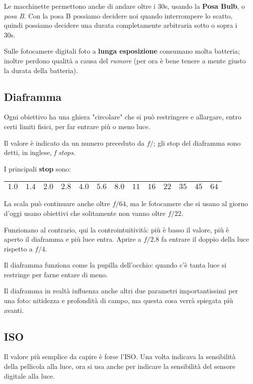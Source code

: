 Le macchinette permettono anche di andare oltre i 30s, usando la \textbf{Posa Bulb}, o \textit{posa B}.
Con la posa B possiamo decidere noi quando interrompere lo scatto, quindi possiamo decidere una durata completamente arbitraria sotto o sopra i 30s.

\nb Sulle fotocamere digitali foto a \textbf{lunga esposizione} consumano molta batteria; inoltre perdono qualità a causa del \textit{rumore} (per ora è bene tenere a mente giusto la durata della batteria).


\subsection{Diaframma} \label{subsec:diaframma}
Ogni obiettivo ha una ghiera "circolare" che si può restringere e allargare, entro certi
limiti fisici, per far entrare più o meno luce.

Il valore è indicato da un numero preceduto da $f/$; gli stop del diaframma sono detti, in inglese, \textit{f stops}.

I principali \textbf{stop} sono:
\begin{table}[h]
    \centering
    \begin{tabular}{|l|l|l|l|l|l|l|l|l|l|l|l|l|}
        \hline
        $1.0$ & $1.4$ & $2.0$ & $2.8$ & $4.0$ & $5.6$ & $8.0$ & $11$ & $16$ & $22$ & $35$ & $45$ & $64$\\
        \hline
    \end{tabular}
\end{table}

\nb La scala può continuare anche oltre $f/64$, ma le fotocamere che si usano al giorno d'oggi usano obiettivi che solitamente non vanno oltre $f/22$.

Funzionano al contrario, qui la controintuitività: più è basso il valore, più è aperto il
diaframma e più luce entra.\newline
Aprire a $f/2.8$ fa entrare il doppio della luce rispetto a $f/4$.

Il diaframma funziona come la pupilla dell'occhio: quando c'è tanta luce si restringe per farne entare di meno.

Il diaframma in realtà influenza anche altri due parametri importantissimi per una foto:
nitidezza e profondità di campo, ma questa cosa verrà spiegata più avanti.


\subsection{ISO}  \label{subsec:ISO}
Il valore più semplice da capire è forse l'ISO.
Una volta indicava la sensibilità della pellicola alla luce, ora si usa anche per indicare la sensibilità del sensore digitale alla luce.

